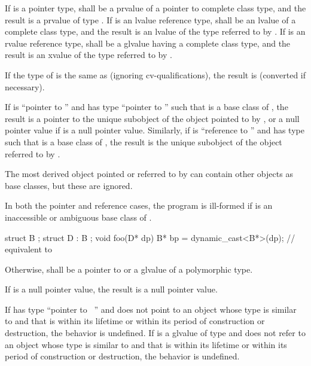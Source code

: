 \pnum
If  is a pointer type,  shall be a prvalue of a
pointer to complete class type, and the result is a prvalue of type
. If  is an lvalue reference type,  shall be
an lvalue of a complete class type, and the result is an lvalue of the
type referred to by . If  is an rvalue reference type,
 shall be a glvalue having a complete class type, and the
result is an xvalue of the type referred to by .

\pnum
If the type of  is the same as  (ignoring cv-qualifications),
the result is
 (converted if necessary).

\pnum
If  is ``pointer to  '' and  has
type ``pointer to  '' such that  is a base
class of , the result is a pointer to the unique 
subobject of the  object pointed to by , or
a null pointer value if  is a null pointer value.
Similarly, if
 is ``reference to  '' and  has
type   such that  is a base class of
, the result is the unique  subobject of the 
object referred to by .
\begin{footnote}
The most derived
object pointed or referred to by
 can contain other  objects as base classes, but these
are ignored.
\end{footnote}
In both the pointer and
reference cases, the program is ill-formed if  is an inaccessible or
ambiguous base class of .
\begin{example}
\begin{codeblock}
struct B { };
struct D : B { };
void foo(D* dp) {
  B*  bp = dynamic_cast<B*>(dp);    // equivalent to 
}
\end{codeblock}
\end{example}

\pnum
Otherwise,  shall be a pointer to or a glvalue of a polymorphic
type.

\pnum
If  is a null pointer value, the result is a null pointer value.

\pnum
If  has type ``pointer to \cv{}~'' and
 does not point to an object
whose type is similar to  and
that is
within its lifetime or
within its period of construction or destruction,
the behavior is undefined.
If  is a glvalue of type  and
 does not refer to an object
whose type is similar to  and
that is
within its lifetime or
within its period of construction or destruction,
the behavior is undefined.

